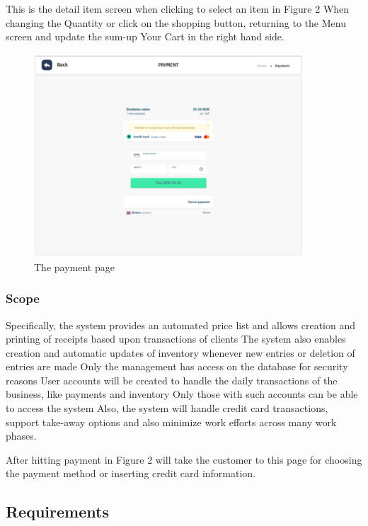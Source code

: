 \documentclass[a4paper]{article}
\numberwithin{equation}{section}
\begin{document}
This is the detail item screen when clicking to select an item in Figure 2
When changing the Quantity or click on the shopping button, returning to the Menu screen and update the sum-up Your Cart in the right hand side.

\begin{figure}[H]
  \centering
  \includegraphics[width=0.9\textwidth]{./assets/t1/UI_payment.png}
  \caption{The payment page}
\end{figure}

\subsubsection{Scope}
Specifically, the system provides an automated price list and allows creation and printing of receipts based upon transactions of clients
The system also enables creation and automatic updates of inventory whenever new entries or deletion of entries are made
Only the management has access on the database for security reasons
User accounts will be created to handle the daily transactions of the business, like payments and inventory
Only those with such accounts can be able to access the system
Also, the system will handle credit card transactions, support take-away options and also minimize work efforts across many work phases.

After hitting payment in Figure 2 will take the customer to this page for choosing the payment method or inserting credit card information.
\subsection{Requirements}
\end{document}
